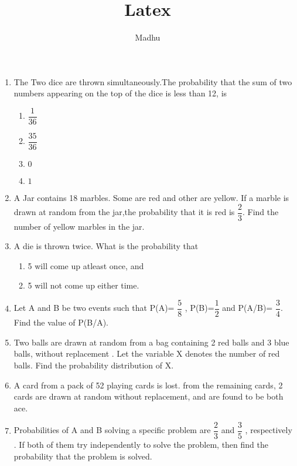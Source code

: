 \documentclass[a4paper,12pt]{article}
\begin{document}
\title{Latex}
\author{Madhu}
\maketitle
{}

\begin{enumerate}

\item The Two dice are thrown simultaneously.The probability that the sum of two numbers appearing on the top of the dice is less than 12, is

\begin{enumerate}
\item $ \dfrac{1}{36} $ 
\item $ \dfrac{35}{36} $
\item $ 0 $
\item $ 1 $
\end{enumerate}


\item A Jar contains 18 marbles. Some are red and other are yellow. If a marble is drawn at random from the jar,the probability that it is red is $ \dfrac{2}{3} $. Find the number of yellow marbles in the jar.

\item

A die is thrown twice. What is the probability that 
\begin{enumerate}
\item 5 will come up atleast once, and
\item 5 will not come up either time.
\end{enumerate}

\item Let A and B be two events such that P(A)= $ \dfrac{5}{8} $ , P(B)=$ \dfrac{1}{2} $ and P(A/B)= $\dfrac{3}{4} $. Find the value of P(B/A).

\item Two balls are drawn at random from a bag containing 2 red balls and 3 blue balls, without replacement . Let the variable X denotes the number of red balls. Find the probability distribution of X.

\item A card from a pack of 52 playing cards is lost. from the remaining cards, 2 cards are drawn at random without replacement, and are found to be both ace.

\item Probabilities of A and B solving a specific problem are $ \dfrac{2}{3} $ and $ \dfrac{3}{5} $ , respectively . If both of them try independently to solve the problem, then find the probability that the problem is solved.


\end{enumerate}
\end{document}
